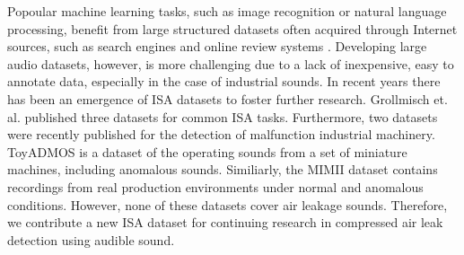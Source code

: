 Popoular machine learning tasks, such as image recognition or natural language processing, benefit from large structured datasets often acquired through Internet sources, such as search engines and online review systems \cite{imagenet2009, Ni2019:amazon}. Developing large audio datasets, however, is more challenging due to a lack of inexpensive, easy to annotate data, especially in the case of industrial sounds. In recent years there has been an emergence of ISA datasets to foster further research.  Grollmisch et. al. \cite{Grollmisch2019:isa} published three datasets for common ISA tasks. Furthermore, two datasets were recently published for the detection of malfunction industrial machinery. ToyADMOS \cite{Koizumi2019:toyadmos} is a dataset of the operating sounds from a set of miniature machines, including anomalous sounds. Similiarly, the MIMII dataset \cite{Purohit2019:mimii} contains recordings from real production environments under normal and anomalous conditions. However, none of these datasets cover air leakage sounds. Therefore, we contribute a new ISA dataset for continuing research in compressed air leak detection using audible sound.
